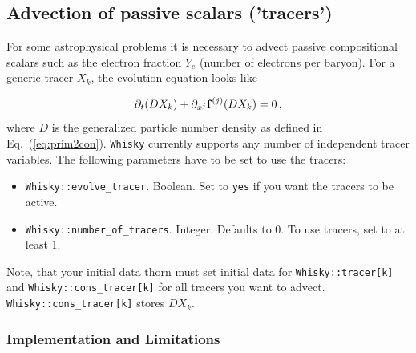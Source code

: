 \documentclass{article}
\begin{document}
\subsection{Advection of passive scalars ('tracers')}
\label{sec:tracer}

For some astrophysical problems it is necessary to advect passive
compositional scalars such as the electron fraction $Y_e$ (number of
electrons per baryon). For a generic tracer $X_k$, the evolution
equation looks like


\begin{equation}
  \label{eq:tracer}
  \partial_t { ( D X_k )} + \partial_{x^j} {\bf f}^{(j)} ({D X_k}) = 0\, ,
\end{equation}
where $D$ is the generalized particle number density as defined in
Eq.~(\ref{eq:prim2con}). {\tt Whisky} currently supports any number of
independent tracer variables. The following parameters have to be
set to use the tracers:

\begin{itemize}
  \item {\tt Whisky::evolve\_tracer}. Boolean. Set to {\tt yes} if
    you want the tracers to be active.
  \item {\tt Whisky::number\_of\_tracers}. Integer. Defaults to 0. To
    use tracers, set to at least 1.
\end{itemize}

Note, that your initial data thorn must set initial data for
{\tt Whisky::tracer[k]} and {\tt Whisky::cons\_tracer[k]} for all tracers
you want to advect. {\tt Whisky::cons\_tracer[k]} stores $D X_k$.

\subsubsection{Implementation and Limitations}
\end{document}
